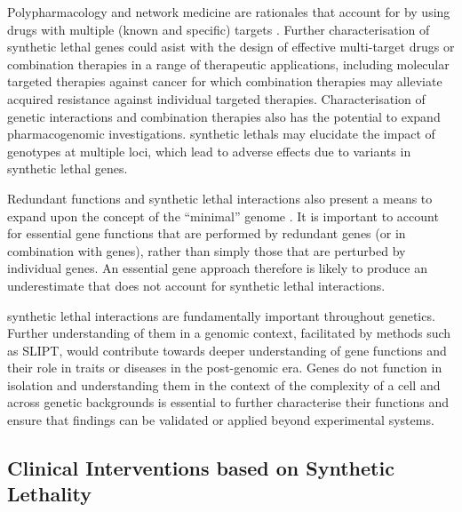 Polypharmacology and network medicine are rationales that account for  by using drugs with multiple (known and specific) targets \citep{Hopkins2008, Barabasi2011}. Further characterisation of \gls{synthetic lethal} genes could asist with the design of effective multi-target drugs or combination therapies in a range of therapeutic applications, including molecular targeted therapies against cancer for which combination therapies may alleviate acquired resistance against individual targeted therapies. Characterisation of genetic interactions and combination therapies also has the potential to expand pharmacogenomic investigations. \Glspl{synthetic lethal} may elucidate the impact of genotypes at multiple loci, which lead to adverse effects due to variants in \gls{synthetic lethal} genes.

Redundant functions and \gls{synthetic lethal} interactions also present a means to expand upon the concept of the ``minimal'' \gls{genome} \citep{Hutchison2016}. It is important to account for \gls{essential} gene functions that are performed by redundant genes (or in combination with  genes), rather than simply those that are perturbed by individual genes. An \gls{essential} gene approach therefore is likely to produce an underestimate that does not account for \gls{synthetic lethal} interactions. 

\Gls{synthetic lethal} interactions are fundamentally important throughout genetics. Further understanding of them in a \gls{genomic} context, facilitated by methods such as \gls{SLIPT}, would contribute towards deeper understanding of gene functions and their role in traits or diseases in the post-genomic era. Genes do not function in isolation and understanding them in the context of the complexity of a cell and across genetic backgrounds is \gls{essential} to further characterise their functions and ensure that findings can be validated or applied beyond experimental systems.


\subsection{Clinical Interventions based on Synthetic Lethality}
\label{chapt6:significance_clinic}

